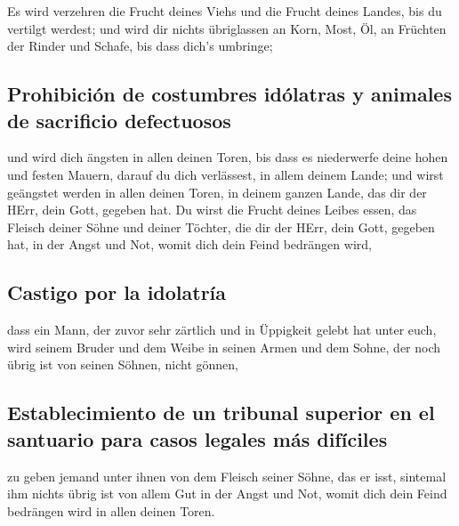  Es wird verzehren die Frucht deines Viehs und die Frucht
deines Landes, bis du vertilgt werdest; und wird dir nichts übriglassen
an Korn, Most, Öl, an Früchten der Rinder und Schafe, bis dass dich's
umbringe;

\hypertarget{prohibiciuxf3n-de-costumbres-iduxf3latras-y-animales-de-sacrificio-defectuosos}{%
\subsection{Prohibición de costumbres idólatras y animales de sacrificio
defectuosos}\label{prohibiciuxf3n-de-costumbres-iduxf3latras-y-animales-de-sacrificio-defectuosos}}

 und wird dich ängsten in allen deinen Toren, bis dass es
niederwerfe deine hohen und festen Mauern, darauf du dich verlässest, in
allem deinem Lande; und wirst geängstet werden in allen deinen Toren, in
deinem ganzen Lande, das dir der HErr, dein Gott, gegeben hat.
 Du wirst die Frucht deines Leibes essen, das Fleisch
deiner Söhne und deiner Töchter, die dir der HErr, dein Gott, gegeben
hat, in der Angst und Not, womit dich dein Feind bedrängen wird,

\hypertarget{castigo-por-la-idolatruxeda}{%
\subsection{Castigo por la
idolatría}\label{castigo-por-la-idolatruxeda}}

 dass ein Mann, der zuvor sehr zärtlich und in Üppigkeit
gelebt hat unter euch, wird seinem Bruder und dem Weibe in seinen Armen
und dem Sohne, der noch übrig ist von seinen Söhnen, nicht gönnen,

\hypertarget{establecimiento-de-un-tribunal-superior-en-el-santuario-para-casos-legales-muxe1s-difuxedciles}{%
\subsection{Establecimiento de un tribunal superior en el santuario para
casos legales más
difíciles}\label{establecimiento-de-un-tribunal-superior-en-el-santuario-para-casos-legales-muxe1s-difuxedciles}}

 zu geben jemand unter ihnen von dem Fleisch seiner
Söhne, das er isst, sintemal ihm nichts übrig ist von allem Gut in der
Angst und Not, womit dich dein Feind bedrängen wird in allen deinen
Toren.

